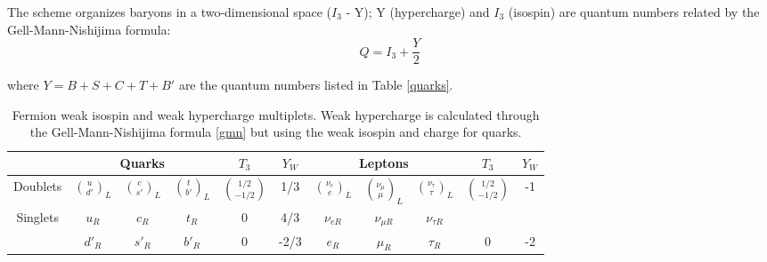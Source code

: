 The scheme organizes baryons in a two-dimensional space ($I_3$ - Y); Y (hypercharge) and $I_3$ (isospin) are quantum numbers related by the Gell-Mann-Nishijima formula\cite{gell_ni,gell_ni2}:
\begin{equation}
Q=I_3 + \frac{Y}{2}
\label{gmn}
\end{equation}

\noindent where $Y=B+S+C+T+B'$ are the quantum numbers listed in Table \ref{quarks}. 

\begin{table}[hb]
\centering
\footnotesize
\begin{tabular}{ccccccccccc} \hline
                          &     \multicolumn{3}{c}{Quarks}                       & $T_3$              & $Y_W$&  \multicolumn{3}{c}{Leptons}                                              & $T_3$                    & $Y_W$\\\hline
Doublets                  & $\binom{u}{d'}_L$& $\binom{c}{s'}_L$& $\binom{t}{b'}_L$& $\binom{1/2}{-1/2}$& 1/3  & $\binom{\nu_e}{e}_L$ & $\binom{\nu_\mu}{\mu}_L$& $\binom{\nu_\tau}{\tau}_L$& $\binom{1/2}{-1/2}$ & -1    \\ %
\multirow{2}{*}{Singlets} & $u_R$            & $c_R$            & $t_R$            & 0                  & 4/3 & $\nu_{eR}$           & $\nu_{\mu R}$           & $\nu_{\tau R}$            &                     &       \\ %
                          & $d'_R$           & $s'_R$           & $b'_R$           & 0                  & -2/3 & $e_R$                & $\mu_R$                 & $\tau_R$                  & 0                   & -2   \\ \hline %
\end{tabular}
\caption[Fermion weak isospin and weak hypercharge multiplets.]{Fermion weak isospin and weak hypercharge multiplets. Weak hypercharge is calculated through the Gell-Mann-Nishijima formula \ref{gmn} but using the weak isospin and charge for quarks.}\label{T3Y}
\end{table}

